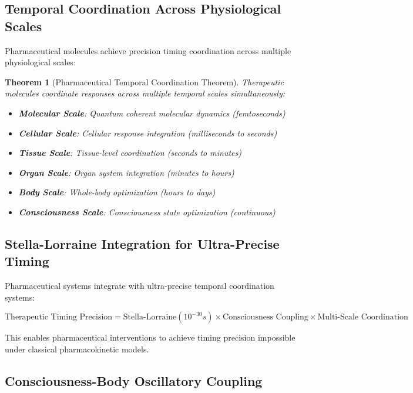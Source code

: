 \documentclass[12pt,a4paper]{article}
\newtheorem{theorem}{Theorem}
\begin{document}
\subsection{Temporal Coordination Across Physiological Scales}

Pharmaceutical molecules achieve precision timing coordination across multiple physiological scales:

\begin{theorem}[Pharmaceutical Temporal Coordination Theorem]
Therapeutic molecules coordinate responses across multiple temporal scales simultaneously:
\begin{itemize}
\item \textbf{Molecular Scale}: Quantum coherent molecular dynamics (femtoseconds)
\item \textbf{Cellular Scale}: Cellular response integration (milliseconds to seconds)
\item \textbf{Tissue Scale}: Tissue-level coordination (seconds to minutes)
\item \textbf{Organ Scale}: Organ system integration (minutes to hours)
\item \textbf{Body Scale}: Whole-body optimization (hours to days)
\item \textbf{Consciousness Scale}: Consciousness state optimization (continuous)
\end{itemize}
\end{theorem}

\subsection{Stella-Lorraine Integration for Ultra-Precise Timing}

Pharmaceutical systems integrate with ultra-precise temporal coordination systems:

\begin{equation}
\text{Therapeutic Timing Precision} = \text{Stella-Lorraine}(10^{-30}s) \times \text{Consciousness Coupling} \times \text{Multi-Scale Coordination}
\end{equation}

This enables pharmaceutical interventions to achieve timing precision impossible under classical pharmacokinetic models.

\subsection{Consciousness-Body Oscillatory Coupling}
\end{document}

